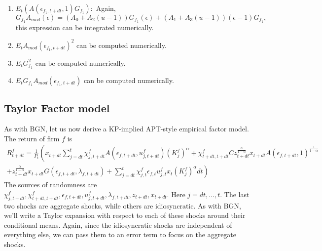 \begin{enumerate}
\begin{equation*}
    A(\epsilon, u) A_{mod}(\epsilon) = (A_0 + A_2(u-1)) A_{mod}(\epsilon) + (A_1 + A_3(u-1)) (\epsilon - 1) A_{mod}(\epsilon).
\end{equation*}
This expression can be integrated numerically.
\item $ E_t (A(\epsilon_{f_1, t+dt}, 1) G_{f_1}):$ Again,  \begin{equation*}
    G_{f_1} A_{mod}(\epsilon) = (A_0 + A_2(u-1)) G_{f_1}(\epsilon) + (A_1 + A_3(u-1)) (\epsilon - 1) G_{f_1},
\end{equation*}
this expression can be integrated numerically.
\item $E_{t} A_{mod}(\epsilon_{f_1, t+dt})^2$ can be computed numerically.
\item $E_t G_{f_1}^2$ can be computed numerically.
\item $E_t G_{f_1} A_{mod}(\epsilon_{f_1, t+dt})$ can be computed numerically.
\end{enumerate}
\subsection{Taylor Factor model}

As with BGN, let us now derive a KP-implied APT-style empirical factor model. The return of firm $f$ is
\begin{multline*}
    R_{t+dt}^f = \frac{1}{P_t}\left(x_{t+dt} \sum_{ j = dt}^{t} \chi_{j, t+dt}^{f} A(\epsilon_{f,t+dt}, u_{j, t+dt}^{f})( K_j^{f})^{\alpha} + \chi_{t+dt, t+dt}^{f}C z_{t+dt}^{\frac{\alpha}{1 - \alpha}} x_{t+dt} A(\epsilon_{f, t+dt}, 1)^{\frac{1}{1 - \alpha}}\right.\\
\left.+ z_{t+dt}^{\frac{\alpha}{1 - \alpha}} x_{t+dt} G(\epsilon_{f,t+dt}, \lambda_{f,t+dt})+ \sum_{j = dt}^t\chi_{j, t}^{f} \epsilon_{f,t} u_{j,t}^{f} x_{t} (K_j^{f})^{\alpha} dt\right)
\end{multline*}
The sources of randomness are $\chi_{j, t+dt}^f, \chi_{t+dt, t+dt}^f, \epsilon_{f, t+dt}, u_{j, t+dt}^f, \lambda_{f, t+dt}, z_{t+dt}, x_{t+dt}.$ Here $j = dt, \ldots, t$. The last two shocks are aggregate shocks, while others are idiosyncratic. As with BGN, we'll write a Taylor expansion with respect to each of these shocks around their conditional means. Again, since the idiosyncratic shocks are independent of everything else, we can pass them to an error term to focus on the aggregate shocks.

